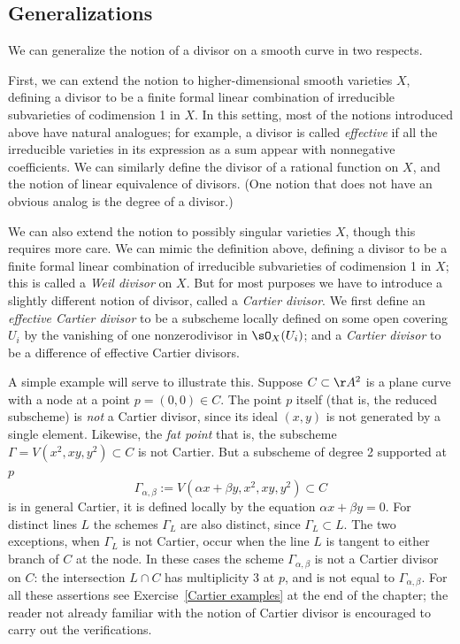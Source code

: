\subsection*{Generalizations}

We can generalize the notion of a divisor on a smooth curve in two respects.

First, we can extend the notion to higher-dimensional smooth varieties
$X$, defining a divisor to be a finite formal linear combination of
irreducible subvarieties of codimension 1 in $X$. In this setting,
most of the notions introduced above have natural analogues; for
%
example, a divisor is called \emph{effective} if all the irreducible
varieties in its expression as a sum appear with nonnegative
coefficients. We can similarly define the divisor of a rational
function on $X$, and the notion of linear equivalence of divisors.
(One notion that does not have an obvious analog is the degree of a divisor.)

We can also extend the notion to possibly singular varieties $X$,
though this requires more care. We can mimic the definition above,
defining a divisor to be a finite formal linear combination of
irreducible subvarieties of codimension 1 in $X$; this is called a
%
\emph{Weil divisor} on $X$. But for most purposes we have to introduce
a slightly different notion of divisor, called a \emph{Cartier
  divisor}. We first define an \emph{effective Cartier divisor} to be
%
a subscheme locally defined on some open covering $U_{i}$ by the
vanishing of one nonzerodivisor in $\sO_{X}(U_{i})$; and a
\emph{Cartier divisor} to be a difference of effective Cartier divisors.

A simple example will serve to illustrate this. Suppose $C \subset
\AA^2$ is a plane curve with a node at a point $p = (0,0) \in C$. The
point $p$ itself (that is, the reduced subscheme) is \emph{not} a
Cartier divisor, since its ideal $(x,y)$ is not generated by a single
element. Likewise, the
\emph{fat point}
%
\emdash that is, the subscheme $\Gamma = V(x^2, xy, y^2) \subset C$
\emdash is not Cartier. But a subscheme of degree 2 supported at $p$
$$
\Gamma_{\alpha, \beta} := V(\alpha x + \beta y, x^2, xy, y^2) \subset C
$$ 
\emdash 
is in general Cartier, 
\since
it is defined locally by the equation $\alpha x + \beta y = 0$. 
For distinct lines $L$ the schemes $\Gamma_{L}$ are also distinct,
since $\Gamma_{L}\subset L$. The two exceptions, when $\Gamma_{L}$ is
not Cartier, occur when the line $L$ is tangent to either branch of
$C$ at the node. 
In these cases the scheme $\Gamma_{\alpha, \beta}$ is not a Cartier
divisor on $C$: the intersection $L \cap C$ has multiplicity 3 at $p$,
and is not equal to $\Gamma_{\alpha, \beta}$. 
For all these assertions see
Exercise~\ref{Cartier examples} 
at the end of the chapter; 
the reader
not already familiar with the notion of Cartier divisor is
encouraged to carry out the verifications. 

